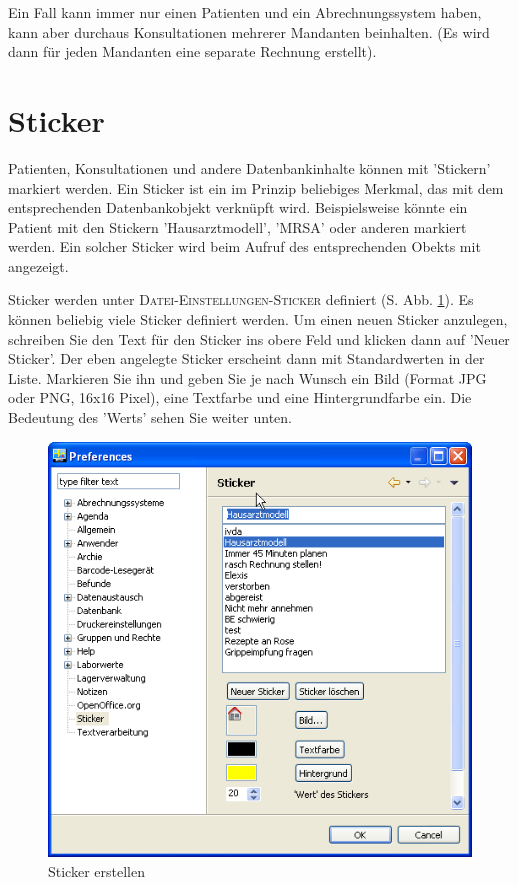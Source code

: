 Ein Fall kann immer nur einen Patienten und ein Abrechnungssystem haben, kann aber durchaus  Konsultationen mehrerer Mandanten beinhalten. (Es wird dann für jeden Mandanten eine separate Rechnung erstellt).

\section{Sticker}
\label{Etiketten}
Patienten, Konsultationen und andere Datenbankinhalte können mit 'Stickern' markiert werden. Ein Sticker ist ein im Prinzip beliebiges Merkmal, das mit dem entsprechenden Datenbankobjekt verknüpft wird. Beispielsweise könnte ein Patient mit den Stickern 'Hausarztmodell', 'MRSA' oder anderen markiert werden. Ein solcher Sticker wird beim Aufruf des entsprechenden Obekts mit angezeigt.

 Sticker werden unter \textsc{Datei-Einstellungen-Sticker} definiert (S. Abb. \ref{fig:etiketten1}). Es können beliebig viele Sticker definiert werden. Um einen neuen Sticker anzulegen, schreiben Sie den Text für den Sticker ins obere Feld und klicken dann auf 'Neuer Sticker'. Der eben angelegte Sticker erscheint dann mit Standardwerten in der Liste. Markieren Sie ihn und geben Sie je nach Wunsch ein Bild (Format JPG oder PNG, 16x16 Pixel), eine Textfarbe und eine Hintergrundfarbe ein. Die Bedeutung des 'Werts' sehen Sie weiter unten.

\begin{figure}
    \includegraphics{images/etikette1}
    \caption{Sticker erstellen}
    \label{fig:etiketten1}
\end{figure}


